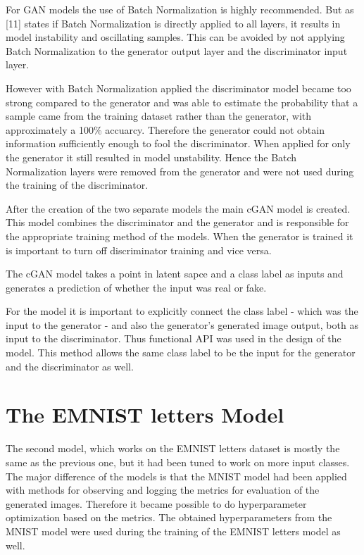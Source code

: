 \documentclass[lettersize,journal]{IEEEtran}
\begin{document}
\vspace*{1em}For GAN models the use of Batch Normalization is highly recommended. But as [11] states if Batch Normalization is directly applied to all layers, it results in model instability and oscillating samples. This can be avoided by not applying Batch Normalization to the generator output layer and the discriminator input layer.

However with Batch Normalization applied the discriminator model became too strong compared to the generator and was able to estimate the probability that a sample came from the training dataset rather than the generator, with approximately a 100\% accuarcy. Therefore the generator could not obtain information sufficiently enough to fool the discriminator. When applied for only the generator it still resulted in model unstability. Hence the Batch Normalization layers were removed from the generator and were not used during the training of the discriminator.

\vspace*{1em}After the creation of the two separate models the main cGAN model is created. This model combines the discriminator and the generator and is responsible for the appropriate training method of the models. When the generator is trained it is important to turn off discriminator training and vice versa.

The cGAN model takes a point in latent sapce and a class label as inputs and generates a prediction of whether the input was real or fake.

For the model it is important to explicitly connect the class label - which was the input to the generator - and also the generator's generated image output, both as input to the discriminator. Thus functional API was used in the design of the model. This method allows the same class label to be the input for the generator and the discriminator as well.




\section{The EMNIST letters Model}

The second model, which works on the EMNIST letters dataset is mostly the same as the previous one, but it had been tuned to work on more input classes.
The major difference of the models is that the MNIST model had been applied with methods for observing and logging the metrics for evaluation of the generated images. Therefore it became possible to do hyperparameter optimization based on the metrics. The obtained hyperparameters from the MNIST model were used during the training of the EMNIST letters model as well.
\end{document}
